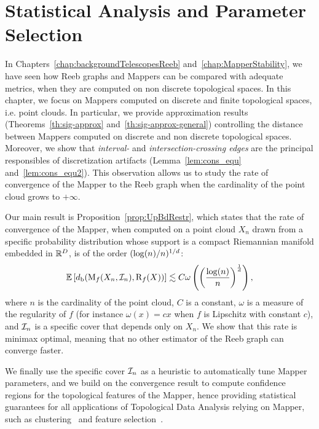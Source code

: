 \chapter{Statistical Analysis and Parameter Selection}
\label{chap:MapperStatistic}



In Chapters~\ref{chap:backgroundTelescopesReeb} and~\ref{chap:MapperStability}, we have seen
how Reeb graphs and Mappers can be compared with adequate metrics, when they are computed on 
non discrete topological spaces. In this chapter, we focus on Mappers 
computed on discrete and finite topological spaces, i.e. point clouds.
In particular, we provide approximation results (Theorems~\ref{th:sig-approx} and~\ref{th:sig-approx-general}) 
controlling the distance between Mappers computed on discrete and non discrete topological spaces.
Moreover, we show that {\em interval-} and {\em intersection-crossing edges} are the principal
responsibles of discretization artifacts (Lemma~\ref{lem:cons_equ} and~\ref{lem:cons_equ2}).
This observation allows us to study the rate of convergence of the Mapper to 
the Reeb graph when the cardinality of the point cloud grows to $+\infty$.

Our main result is Proposition~\ref{prop:UpBdRestr}, which states that
 the rate of convergence of the Mapper, when computed on a point cloud $X_n$ drawn from a specific probability distribution whose support is a compact Riemannian manifold embedded in $\mathbb{R}^D$, 
is of the order $({\rm log}(n)/n)^{1/d}$:
$$ \mathbb{E}\left[d_{\rm b}(\mathrm{M}_f(X_n,\mathcal{I}_n),\mathrm{R}_f(X))\right]\lesssim C\omega\left(\left(\frac{{\rm log}(n)}{n}\right)^{\frac 1d}\right),$$
where $n$ is the cardinality of the point cloud, $C$ is a constant, $\omega$ is a measure of the regularity of $f$ (for instance $\omega(x)=cx$
when $f$ is Lipschitz with constant $c$),
and $\mathcal{I}_n$ is a specific cover that depends only on $X_n$. 
We show that this rate is minimax optimal, meaning that no other estimator of the Reeb graph
can converge faster.

We finally use the specific cover $\mathcal{I}_n$ as a heuristic to automatically tune Mapper parameters,
and we build on the convergence result to compute confidence regions for the topological features of the Mapper,
hence providing statistical guarantees for all applications of Topological Data Analysis relying on Mapper,
such as clustering~\cite{Lum13,Nicolau11} and feature selection~\cite{Nielson15, Rucco15}.
   

%
%

